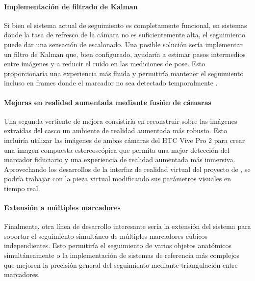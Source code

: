 \paragraph{Implementación de filtrado de Kalman}
Si bien el sistema actual de seguimiento es completamente funcional, en sistemas donde la tasa de refresco de la cámara no es suficientemente alta, el seguimiento puede dar una sensación de escalonado. Una posible solución sería implementar un filtro de Kalman que, bien configurado, ayudaría a estimar pasos intermedios entre imágenes y a reducir el ruido en las mediciones de pose. Esto proporcionaría una experiencia más fluida y permitiría mantener el seguimiento incluso en frames donde el marcador no sea detectado temporalmente \cite{welch2020kalman}.

\paragraph{Mejoras en realidad aumentada mediante fusión de cámaras}
Una segunda vertiente de mejora consistiría en reconstruir sobre las imágenes extraídas del casco un ambiente de realidad aumentada más robusto. Esto incluiría utilizar las imágenes de ambas cámaras del HTC Vive Pro 2 para crear una imagen compuesta estereoscópica que permita una mejor detección del marcador fiduciario y una experiencia de realidad aumentada más inmersiva. Aprovechando los desarrollos de la interfaz de realidad virtual del proyecto de \citeauthor{IglesiasGuitian2022}, se podría trabajar con la pieza virtual modificando sus parámetros visuales en tiempo real.

\paragraph{Extensión a múltiples marcadores}
Finalmente, otra línea de desarrollo interesante sería la extensión del sistema para soportar el seguimiento simultáneo de múltiples marcadores cúbicos independientes. Esto permitiría el seguimiento de varios objetos anatómicos simultáneamente o la implementación de sistemas de referencia más complejos que mejoren la precisión general del seguimiento mediante triangulación entre marcadores.
